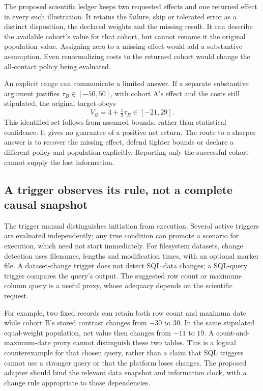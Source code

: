 The proposed scientific ledger keeps two requested effects and one returned
effect in every such illustration. It retains the failure, skip or tolerated
error as a distinct disposition, the declared weights and the missing result.
It can describe the available cohort's value for that cohort, but cannot
rename it the original population value. Assigning zero to a missing effect
would add a substantive assumption. Even renormalizing costs to the returned
cohort would change the all-contact policy being evaluated.

An explicit range can communicate a limited answer. If a separate substantive
argument justifies $\tau_B\in[-50,50]$, with cohort A's effect and the costs
still stipulated, the original target obeys
\begin{equation}
 V_{\mathcal Q}=4+\tfrac12\tau_B\in[-21,29].
 \label{exec23:dss-bounds}
\end{equation}
This identified set follows from assumed bounds, rather than statistical
confidence. It gives no guarantee of a positive net return. The route to a
sharper answer is to recover the missing effect, defend tighter bounds or
declare a different policy and population explicitly. Reporting only the
successful cohort cannot supply the lost information.
\citep{exec23_dss_denominator_reference}

\subsection{A trigger observes its rule, not a complete causal snapshot}

The trigger manual distinguishes initiation from execution. Several active
triggers are evaluated independently; any true condition can promote a scenario
for execution, which need not start immediately. For filesystem datasets,
change detection uses filenames, lengths and modification times, with an
optional marker file. A dataset-change trigger does not detect SQL data
changes; a SQL-query trigger compares the query's output. The suggested row
count or maximum-column query is a useful proxy, whose adequacy depends on the
scientific request.~\citep{exec23_dss_latest_triggers}

For example, two fixed records can retain both row count and maximum date
while cohort B's stored contrast changes from $-30$ to $30$. In the same
stipulated equal-weight population, net value then changes from $-11$ to $19$.
A count-and-maximum-date proxy cannot distinguish these two tables. This is a
logical counterexample for that chosen query, rather than a claim that SQL
triggers cannot use a stronger query or that the platform loses changes.
The proposed adapter should bind the relevant data snapshot and information
clock, with a change rule appropriate to those dependencies.
\citep{exec23_dss_denominator_reference}

